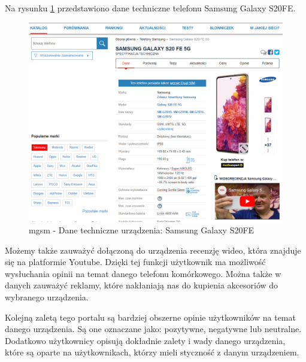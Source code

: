 \newpage
Na rysunku \ref*{mgsm_3} przedstawiono dane techniczne telefonu Samsung Galaxy S20FE.
\begin{figure}[H]
    \centering
    \includegraphics[scale=0.48]{img/mgsm/DetailsMgsm.png}
    \caption{mgsm - Dane techniczne urządzenia: Samsung Galaxy S20FE}
    \label{mgsm_3}
\end{figure}
Możemy także zauważyć dołączoną do urządzenia recenzję wideo, która znajduje się na platformie Youtube. Dzięki tej funkcji użytkownik ma możliwość wysłuchania opinii na temat danego telefonu komórkowego. Można także w danych zauważyć reklamy, które nakłaniają nas do kupienia akcesoriów do wybranego urządzenia.

Kolejną zaletą tego portalu są bardziej obszerne opinie użytkowników na temat danego urządzenia. Są one oznaczane jako: pozytywne, negatywne lub neutralne. Dodatkowo użytkownicy opisują dokładnie zalety i wady danego urządzenia, które są oparte na użytkownikach, którzy mieli styczność z danym urządzeniem.  

